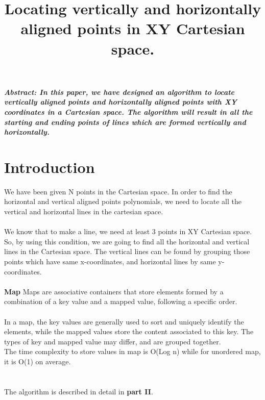 \documentclass[conference]{IEEEtran}
\begin{document}
\title{
Locating vertically and horizontally aligned points in XY Cartesian space.\\
}

\author{
\and
{}
\and
{}
}

\maketitle

\textbf{\emph{{Abstract}: In this paper, we have designed an algorithm to locate vertically aligned points and horizontally aligned points with XY coordinates in a Cartesian space. The algorithm will result in all the starting and ending points of lines which are formed vertically and horizontally.
}}\\

\section{\textbf{Introduction}}
\noindent We have been given N points in the Cartesian space. In order to find the horizontal and vertical aligned points polynomials, we need to locate all the vertical and horizontal lines in the cartesian space. \\
\\
\noindent We know that to make a line, we need at least 3 points in XY Cartesian space. So, by using this condition, we are going to find all the horizontal and vertical lines in the Cartesian space. The vertical lines can be found by grouping those points which have same x-coordinates, and horizontal lines by same y-coordinates.\\
\\
\textbf{Map} Maps are associative containers that store elements formed by a combination of a key value and a mapped value, following a specific order.\\
\\In a map, the key values are generally used to sort and uniquely identify the elements, while the mapped values store the content associated to this key. The types of key and mapped value may differ, and are grouped together.\\

The time complexity to store values in map is  O(Log n) while for unordered map, it is O(1) on average. \\
\\
\\
\noindent The algorithm  is described in detail in \textbf{part II}.\\
\end{document}

